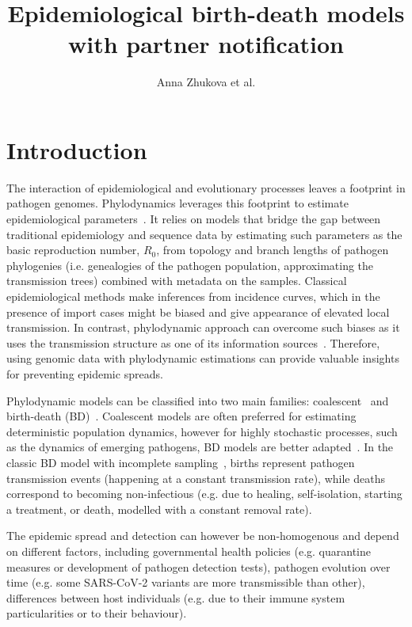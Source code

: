\documentclass[a4paper,10pt]{article}
\title{Epidemiological birth-death models with partner notification}
\author{Anna Zhukova et al.}
\begin{document}
\maketitle

%

\section{Introduction}
The interaction of epidemiological and evolutionary processes leaves a footprint in pathogen genomes. Phylodynamics leverages this footprint to estimate epidemiological parameters~\citep{Grenfell2004a,Volz2013}. It relies on models that bridge the gap between traditional epidemiology and sequence data by estimating such parameters as the basic reproduction number, $R_0$, from topology and branch lengths of pathogen phylogenies (i.e. genealogies of the pathogen population, approximating the transmission trees) combined with metadata on the samples. Classical epidemiological methods make inferences from incidence curves, which in the presence of import cases might be biased and give appearance of elevated local transmission. In contrast, phylodynamic approach can overcome such biases as it uses the transmission structure as one of its information sources~\citep{vaughanEstimatesEarlyOutbreakspecific2024}. Therefore, using genomic data with phylodynamic estimations can provide valuable insights for preventing epidemic spreads.


Phylodynamic models can be classified into two main families:  coalescent~\citep{Volz2009a,Drummond2005,Pybus2000a} and birth-death (BD)~\citep{Kendall1948,Maddison2007,Stadler2009,Stadler2010}. Coalescent models are often preferred for estimating deterministic population dynamics, however for highly stochastic processes, such as the dynamics of emerging pathogens, BD models are better adapted~\citep{Macpherson2021}. In the classic BD model with incomplete sampling~\citep{Stadler2009}, births represent pathogen transmission events (happening at a constant transmission rate), while deaths correspond to becoming non-infectious (e.g. due to healing, self-isolation, starting a treatment, or death, modelled with a constant removal rate). 

The epidemic spread and detection can however be non-homogenous and depend on different factors, including governmental health policies (e.g. quarantine measures or development of pathogen detection tests), pathogen evolution over time (e.g. some SARS-CoV-2 variants are more transmissible than other),  differences between host individuals (e.g. due to their immune system particularities or to their behaviour).
\end{document}
